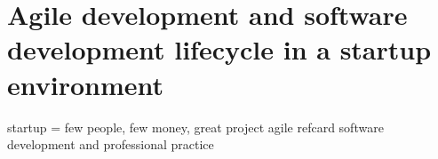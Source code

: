 \chapter{Agile development and software development lifecycle in a startup environment}
\label{ch:startup}
startup = few people, few money, great project
agile refcard
software development and professional practice